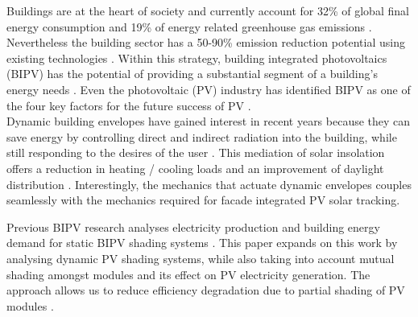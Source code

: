 
Buildings are at the heart of society and currently account for 32\% of global final energy consumption and 19\% of energy related greenhouse gas emissions \cite{IPCC}. Nevertheless the building sector has a 50-90\% emission reduction potential using existing technologies \cite{IPCC}. Within this strategy, building integrated photovoltaics (BIPV) has the potential of providing a substantial segment of a building's energy needs \cite{defaix2012technical}. Even the photovoltaic (PV) industry has identified BIPV as one of the four key factors for the future success of PV \cite{raugei2009life}. \\



Dynamic building envelopes have gained interest in recent years because they can save energy by controlling direct and indirect radiation into the building, while still responding to the desires of the user \cite{loonen2013climate}. This mediation of solar insolation offers a reduction in heating / cooling loads and an improvement of daylight distribution \cite{rossi2012adaptive}. Interestingly, the mechanics that actuate dynamic envelopes couples seamlessly with the mechanics required for facade integrated PV solar tracking. 

Previous BIPV research analyses electricity production and building energy demand for static BIPV shading systems \cite{mandalaki2012assessment} \cite{yoo2011available} \cite{freitas2015maximizing}. This paper expands on this work by analysing dynamic PV shading systems, while also taking into account mutual shading amongst modules and its effect on PV electricity generation. The approach allows us to reduce efficiency degradation due to partial shading of PV modules \cite{hofer2015PVSEC}.%

